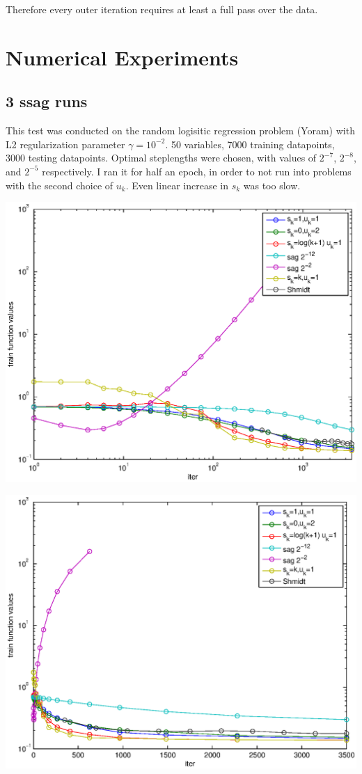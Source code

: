 \documentclass[12pt]{article}
\begin{document}
		Therefore every outer iteration requires at least a full pass over the data. 
		\newpage
	\section{Numerical Experiments}
	
	\subsection{3 ssag runs}
	This test was conducted on the random logisitic regression problem (Yoram) with L2 regularization parameter $\gamma = 10^{-2}$. 50 variables, 7000 training datapoints, 3000 testing datapoints. Optimal steplengths were chosen, with values of $2^{-7}$, $2^{-8}$, and $2^{-5}$ respectively. I ran it for half an epoch, in order to not run into problems with the second choice of $u_k$. Even linear increase in $s_k$ was too slow.
	\begin{center}
	\includegraphics{Figures/12-1-log.eps} 
	\end{center}	
	\begin{center}
	\includegraphics{Figures/12-1-nolog.eps} 
	\end{center}
\end{document}
